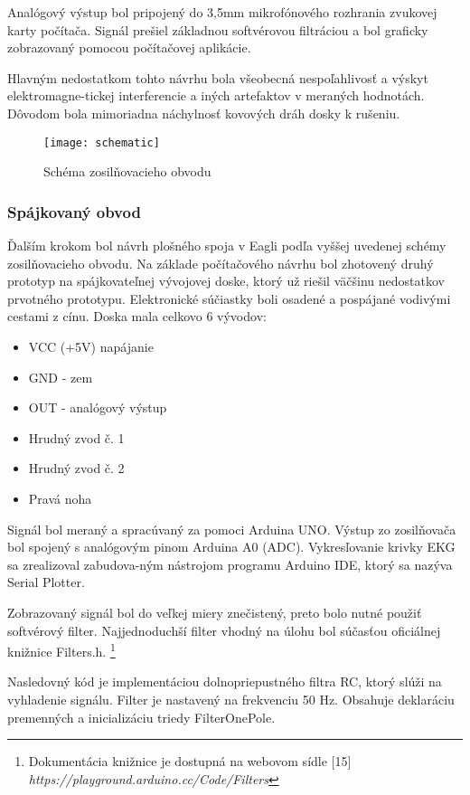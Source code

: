 \documentclass[titlepage,12pt]{article}
\begin{document}
Analógový výstup bol pripojený do 3,5mm mikrofónového rozhrania zvukovej karty počítača. Signál prešiel základnou softvérovou filtráciou a bol graficky zobrazovaný pomocou počítačovej aplikácie.

Hlavným nedostatkom tohto návrhu bola všeobecná nespoľahlivosť a výskyt elektromagne-tickej interferencie a iných artefaktov v meraných hodnotách. Dôvodom bola mimoriadna náchylnosť kovových dráh dosky k rušeniu.


\begin{figure}[!ht]
\begin{center}
\texttt{[image: schematic]}
\caption{Schéma zosilňovacieho obvodu}
\end{center}
\end{figure}

\newpage
\subsubsection{Spájkovaný obvod}
Ďalším krokom bol návrh plošného spoja v Eagli podľa vyššej uvedenej schémy zosilňovacieho obvodu. Na základe počítačového návrhu bol zhotovený druhý prototyp na spájkovateľnej vývojovej doske, ktorý už riešil väčšinu nedostatkov prvotného prototypu. Elektronické súčiastky boli osadené a pospájané vodivými cestami z cínu. Doska mala celkovo 6 vývodov:
\begin{itemize}
	\item VCC (+5V) napájanie
	\item GND - zem
	\item OUT - analógový výstup
	\item Hrudný zvod č. 1
	\item Hrudný zvod č. 2
	\item Pravá noha
\end{itemize}
Signál bol meraný a spracúvaný za pomoci Arduina UNO. Výstup zo zosilňovača bol spojený \linebreak s analógovým pinom Arduina A0 (ADC). Vykresľovanie krivky EKG sa zrealizoval zabudova-ným nástrojom programu Arduino IDE, ktorý sa nazýva Serial Plotter.

Zobrazovaný signál bol do veľkej miery znečistený, preto bolo nutné použiť softvérový filter. Najjednoduchší filter vhodný na úlohu bol súčasťou oficiálnej knižnice Filters.h. \footnote{Dokumentácia knižnice je dostupná na webovom sídle [15] \textit{https://playground.arduino.cc/Code/Filters}}

Nasledovný kód je implementáciou dolnopriepustného filtra RC, ktorý slúži na vyhladenie signálu. Filter je nastavený na frekvenciu 50 Hz. Obsahuje deklaráciu premenných a inicializáciu triedy FilterOnePole.
\end{document}
